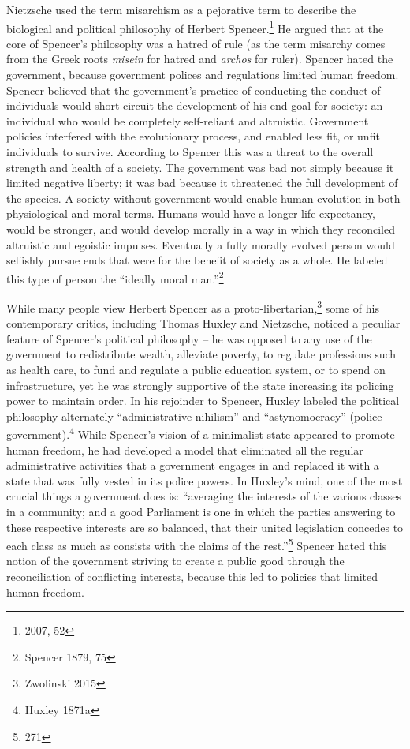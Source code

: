 \documentclass[12pt,]{article}
\begin{document}
Nietzsche used the term misarchism as a pejorative term to describe the
biological and political philosophy of Herbert Spencer.\footnote{2007,
  52} He argued that at the core of Spencer's philosophy was a hatred of
rule (as the term misarchy comes from the Greek roots \emph{misein} for
hatred and \emph{archos} for ruler). Spencer hated the government,
because government polices and regulations limited human freedom.
Spencer believed that the government's practice of conducting the
conduct of individuals would short circuit the development of his end
goal for society: an individual who would be completely self-reliant and
altruistic. Government policies interfered with the evolutionary
process, and enabled less fit, or unfit individuals to survive.
According to Spencer this was a threat to the overall strength and
health of a society. The government was bad not simply because it
limited negative liberty; it was bad because it threatened the full
development of the species. A society without government would enable
human evolution in both physiological and moral terms. Humans would have
a longer life expectancy, would be stronger, and would develop morally
in a way in which they reconciled altruistic and egoistic impulses.
Eventually a fully morally evolved person would selfishly pursue ends
that were for the benefit of society as a whole. He labeled this type of
person the ``ideally moral man.''\footnote{Spencer 1879, 75}

While many people view Herbert Spencer as a proto-libertarian,\footnote{Zwolinski
  2015} some of his contemporary critics, including Thomas Huxley and
Nietzsche, noticed a peculiar feature of Spencer's political philosophy
-- he was opposed to any use of the government to redistribute wealth,
alleviate poverty, to regulate professions such as health care, to fund
and regulate a public education system, or to spend on infrastructure,
yet he was strongly supportive of the state increasing its policing
power to maintain order. In his rejoinder to Spencer, Huxley labeled the
political philosophy alternately ``administrative nihilism'' and
``astynomocracy'' (police government).\footnote{Huxley 1871a} While
Spencer's vision of a minimalist state appeared to promote human
freedom, he had developed a model that eliminated all the regular
administrative activities that a government engages in and replaced it
with a state that was fully vested in its police powers. In Huxley's
mind, one of the most crucial things a government does is: ``averaging
the interests of the various classes in a community; and a good
Parliament is one in which the parties answering to these respective
interests are so balanced, that their united legislation concedes to
each class as much as consists with the claims of the rest.''\footnote{271}
Spencer hated this notion of the government striving to create a public
good through the reconciliation of conflicting interests, because this
led to policies that limited human freedom.
\end{document}
